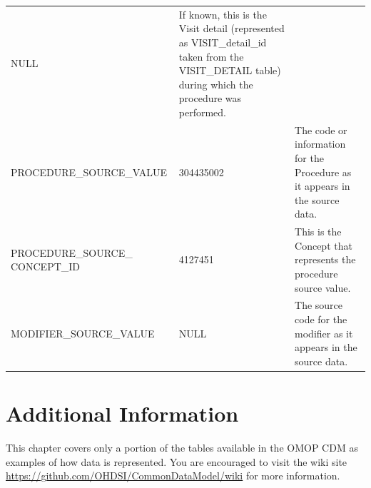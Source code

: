 \documentclass[11pt]{book}
\theoremstyle{definition}
\theoremstyle{definition}
\theoremstyle{definition}
\theoremstyle{remark}
\begin{document}
\begin{longtable}[]{@{}lll@{}}
\begin{minipage}[t]{0.15\columnwidth}
NULL\strut
\end{minipage} & \begin{minipage}[t]{0.49\columnwidth}\raggedright
If known, this is the Visit detail (represented as VISIT\_detail\_id taken from the VISIT\_DETAIL table) during which the procedure was performed.\strut
\end{minipage}\tabularnewline
\begin{minipage}[t]{0.28\columnwidth}\raggedright
PROCEDURE\_SOURCE\_VALUE\strut
\end{minipage} & \begin{minipage}[t]{0.15\columnwidth}\raggedright
304435002\strut
\end{minipage} & \begin{minipage}[t]{0.49\columnwidth}\raggedright
The code or information for the Procedure as it appears in the source data.\strut
\end{minipage}\tabularnewline
\begin{minipage}[t]{0.28\columnwidth}\raggedright
PROCEDURE\_SOURCE\_ CONCEPT\_ID\strut
\end{minipage} & \begin{minipage}[t]{0.15\columnwidth}\raggedright
4127451\strut
\end{minipage} & \begin{minipage}[t]{0.49\columnwidth}\raggedright
This is the Concept that represents the procedure source value.\strut
\end{minipage}\tabularnewline
\begin{minipage}[t]{0.28\columnwidth}\raggedright
MODIFIER\_SOURCE\_VALUE\strut
\end{minipage} & \begin{minipage}[t]{0.15\columnwidth}\raggedright
NULL\strut
\end{minipage} & \begin{minipage}[t]{0.49\columnwidth}\raggedright
The source code for the modifier as it appears in the source data.\strut
\end{minipage}\tabularnewline
\bottomrule
\end{longtable}

\hypertarget{additional-information}{%
\section{Additional Information}\label{additional-information}}

This chapter covers only a portion of the tables available in the OMOP CDM as examples of how data is represented. You are encouraged to visit the wiki site \url{https://github.com/OHDSI/CommonDataModel/wiki} for more information.
\end{document}
